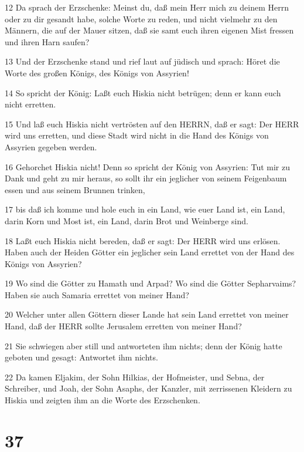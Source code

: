 \par 12 Da sprach der Erzschenke: Meinst du, daß mein Herr mich zu deinem Herrn oder zu dir gesandt habe, solche Worte zu reden, und nicht vielmehr zu den Männern, die auf der Mauer sitzen, daß sie samt euch ihren eigenen Mist fressen und ihren Harn saufen?
\par 13 Und der Erzschenke stand und rief laut auf jüdisch und sprach: Höret die Worte des großen Königs, des Königs von Assyrien!
\par 14 So spricht der König: Laßt euch Hiskia nicht betrügen; denn er kann euch nicht erretten.
\par 15 Und laß euch Hiskia nicht vertrösten auf den HERRN, daß er sagt: Der HERR wird uns erretten, und diese Stadt wird nicht in die Hand des Königs von Assyrien gegeben werden.
\par 16 Gehorchet Hiskia nicht! Denn so spricht der König von Assyrien: Tut mir zu Dank und geht zu mir heraus, so sollt ihr ein jeglicher von seinem Feigenbaum essen und aus seinem Brunnen trinken,
\par 17 bis daß ich komme und hole euch in ein Land, wie euer Land ist, ein Land, darin Korn und Most ist, ein Land, darin Brot und Weinberge sind.
\par 18 Laßt euch Hiskia nicht bereden, daß er sagt: Der HERR wird uns erlösen. Haben auch der Heiden Götter ein jeglicher sein Land errettet von der Hand des Königs von Assyrien?
\par 19 Wo sind die Götter zu Hamath und Arpad? Wo sind die Götter Sepharvaims? Haben sie auch Samaria errettet von meiner Hand?
\par 20 Welcher unter allen Göttern dieser Lande hat sein Land errettet von meiner Hand, daß der HERR sollte Jerusalem erretten von meiner Hand?
\par 21 Sie schwiegen aber still und antworteten ihm nichts; denn der König hatte geboten und gesagt: Antwortet ihm nichts.
\par 22 Da kamen Eljakim, der Sohn Hilkias, der Hofmeister, und Sebna, der Schreiber, und Joah, der Sohn Asaphs, der Kanzler, mit zerrissenen Kleidern zu Hiskia und zeigten ihm an die Worte des Erzschenken.

\chapter{37}

